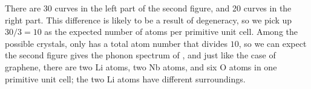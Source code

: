 \documentclass[hyperref, a4paper]{article}
\begin{document}
There are 30 curves in the left part of the second figure,
and 20 curves in the right part.
This difference is likely to be a result of degeneracy,
so we pick up $30 / 3 = 10$ as the expected number of atoms per primitive unit cell.
Among the possible crystals,
only  has a total atom number that divides $10$,
so we can expect the second figure gives the phonon spectrum of ,
and just like the case of graphene,
there are two Li atoms, two Nb atoms, and six O atoms in one primitive unit cell;
the two Li atoms have different surroundings.



\end{document}
